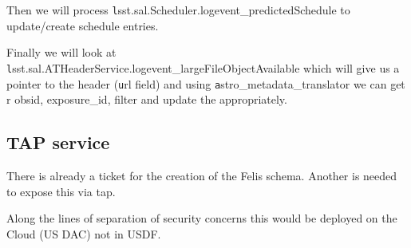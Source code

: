Then we will process {\texttt lsst.sal.Scheduler.logevent\_predictedSchedule } to update/create schedule entries.

Finally we will look at {\texttt lsst.sal.ATHeaderService.logevent\_largeFileObjectAvailable} which will give us a pointer to the header ({\texttt url} field) and using {\texttt astro\_metadata\_translator}  we can get r obsid, exposure\_id, filter and update the \DB appropriately.

\subsection{TAP service}

There is already a ticket  for the creation of the Felis schema.
Another is needed to expose this via tap.

Along the lines of separation of security concerns this would be deployed on the Cloud (US DAC) not in USDF.
